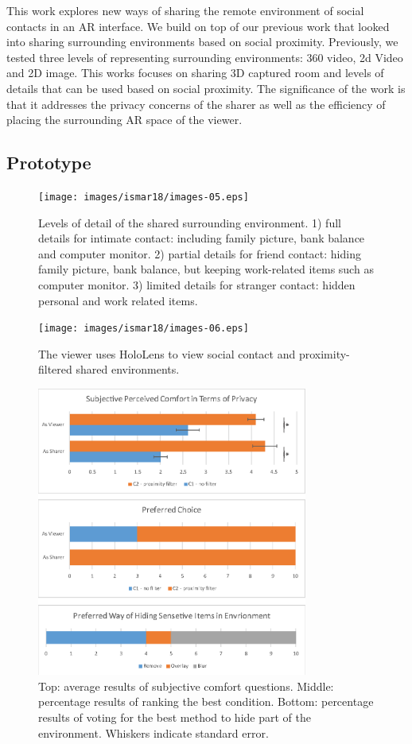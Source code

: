 This work explores new ways of sharing the remote environment of social contacts in an AR interface. We build on top of our previous work \cite{Nassani2018a} that looked into sharing surrounding environments based on social proximity. Previously, we tested three levels of representing surrounding environments: 360 video, 2d Video and 2D image. This works focuses on sharing 3D captured room and levels of details that can be used based on social proximity. The significance of the work is that it addresses the privacy concerns of the sharer as well as the efficiency of placing the surrounding AR space of the viewer.

\subsection{Prototype}

\begin{figure}[ht]
  \centering
  \texttt{[image: images/ismar18/images-05.eps]}
  \caption{Levels of detail of the shared surrounding environment. 1) full details for intimate contact: including family picture, bank balance and computer monitor. 2) partial details for friend contact: hiding family picture, bank balance, but keeping work-related items such as computer monitor. 3) limited details for stranger contact: hidden personal and work related items.}
  \label{fig:environment:environment-levels}
\end{figure}

\begin{figure}
    \centering
    \texttt{[image: images/ismar18/images-06.eps]}
    \caption{The viewer uses HoloLens to view social contact and proximity-filtered shared environments.}
    \label{fig:environment:setup}
\end{figure}

\begin{figure}[t]
  \centering
  \includegraphics[width=3.5in]{images/ismar18/images-04.eps}
  \caption{Top: average results of subjective comfort questions. Middle: percentage results of ranking the best condition. Bottom: percentage results of voting for the best method to hide part of the environment. Whiskers indicate standard error.}
  \label{fig:environment:results}
\end{figure}

